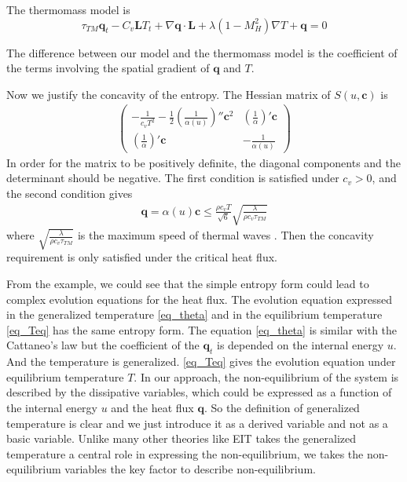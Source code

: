 \documentclass[a4paper]{article}
\begin{document}
The thermomass model is 
\begin{equation}
\tau_{TM} \mathbf{q}_t-C_v \mathbf{L}T_t+\nabla \mathbf{q} \cdot \mathbf{L}+\lambda(1-M_H^2)\nabla T+\mathbf{q}=0
\end{equation}

The difference between our model and the thermomass model is the coefficient of the terms involving the spatial gradient of $\mathbf{q}$ and $T$.

Now we justify the concavity of the entropy. The Hessian matrix of $S(u,\mathbf{c})$ is
\begin{eqnarray}
\left( \begin{array}{ll} -\frac{1}{c_v T^2}-\frac{1}{2}(\frac{1}{\alpha(u)})'' \mathbf{c}^2 & (\frac{1}{\alpha})'\mathbf{c} \\ (\frac{1}{\alpha})'\mathbf{c} & -\frac{1}{\alpha(u)} \end{array} \right)
\end{eqnarray}
In order for the matrix to be positively definite, the diagonal components and the determinant should be negative. The first condition is satisfied under $c_v>0$, and the second condition gives
\begin{eqnarray}
\mathbf{q}=\alpha(u)\mathbf{c} \le \frac{\rho c_v T}{\sqrt{6}} \sqrt{\frac{\lambda}{\rho c_v \tau_{TM}}}
\end{eqnarray}
where $\sqrt{\frac{\lambda}{\rho c_v \tau_{TM}}}$ is the maximum speed of thermal waves \cite{Jou1996extended}. Then the concavity requirement is only satisfied under the critical heat flux.


From the example, we could see that the simple entropy form could lead to complex evolution equations for the heat flux. The evolution equation expressed in the generalized temperature \eqref{eq_theta} and in the equilibrium temperature \eqref{eq_Teq} has the same entropy form. The equation  \eqref{eq_theta} is similar with the Cattaneo's law but the coefficient of the $\mathbf{q}_t$ is depended on the internal energy $u$. And the temperature is generalized. \eqref{eq_Teq} gives the evolution equation under equilibrium temperature $T$. In our approach, the non-equilibrium of the system is described by the dissipative variables, which could be expressed as a function of the internal energy $u$ and the heat flux $\mathbf{q}$. So the definition of generalized temperature is clear and we just introduce it as a derived variable and not as a basic variable. Unlike many other theories like EIT takes the generalized temperature a central role in expressing the non-equilibrium, we takes the non-equilibrium variables the key factor to describe non-equilibrium.
\end{document}
